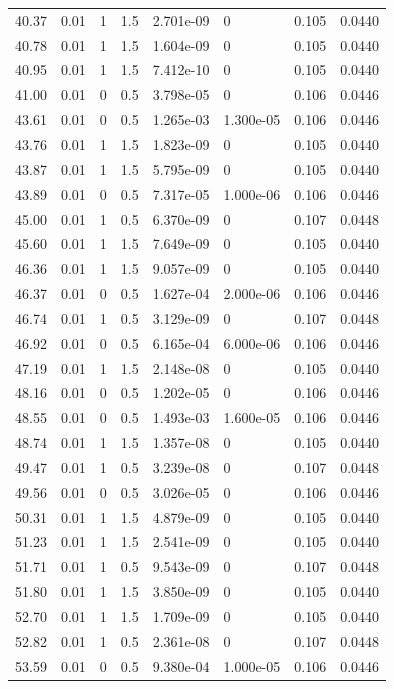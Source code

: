 \documentclass[preview]{standalone}
\begin{document}
{{{\begin{tabular}{L{1.2cm}C{1.2cm} C{0.3cm}C{0.5cm} C{1.4cm}C{1.4cm} C{1.4cm}C{1.4cm}}
  40.37  &  0.01  & 1     & 1.5 &  2.701e-09  & 0  & 0.105 &  0.0440   \\ 
  40.78  &  0.01  & 1     & 1.5 &  1.604e-09  & 0  & 0.105 &  0.0440   \\ 
  40.95  &  0.01  & 1     & 1.5 &  7.412e-10  & 0  & 0.105 &  0.0440   \\ 
  41.00  &  0.01  & 0     & 0.5 &  3.798e-05  & 0  & 0.106 &  0.0446   \\ 
  43.61  &  0.01  & 0     & 0.5 &  1.265e-03  & 1.300e-05  & 0.106 &  0.0446   \\ 
  43.76  &  0.01  & 1     & 1.5 &  1.823e-09  & 0  & 0.105 &  0.0440   \\ 
  43.87  &  0.01  & 1     & 1.5 &  5.795e-09  & 0  & 0.105 &  0.0440   \\ 
  43.89  &  0.01  & 0     & 0.5 &  7.317e-05  & 1.000e-06  & 0.106 &  0.0446   \\ 
  45.00  &  0.01  & 1     & 0.5 &  6.370e-09  & 0  & 0.107 &  0.0448   \\ 
  45.60  &  0.01  & 1     & 1.5 &  7.649e-09  & 0  & 0.105 &  0.0440   \\ 
  46.36  &  0.01  & 1     & 1.5 &  9.057e-09  & 0  & 0.105 &  0.0440   \\ 
  46.37  &  0.01  & 0     & 0.5 &  1.627e-04  & 2.000e-06  & 0.106 &  0.0446   \\ 
  46.74  &  0.01  & 1     & 0.5 &  3.129e-09  & 0  & 0.107 &  0.0448   \\ 
  46.92  &  0.01  & 0     & 0.5 &  6.165e-04  & 6.000e-06  & 0.106 &  0.0446   \\ 
  47.19  &  0.01  & 1     & 1.5 &  2.148e-08  & 0  & 0.105 &  0.0440   \\ 
  48.16  &  0.01  & 0     & 0.5 &  1.202e-05  & 0  & 0.106 &  0.0446   \\ 
  48.55  &  0.01  & 0     & 0.5 &  1.493e-03  & 1.600e-05  & 0.106 &  0.0446   \\ 
  48.74  &  0.01  & 1     & 1.5 &  1.357e-08  & 0  & 0.105 &  0.0440   \\ 
  49.47  &  0.01  & 1     & 0.5 &  3.239e-08  & 0  & 0.107 &  0.0448   \\ 
  49.56  &  0.01  & 0     & 0.5 &  3.026e-05  & 0  & 0.106 &  0.0446   \\ 
  50.31  &  0.01  & 1     & 1.5 &  4.879e-09  & 0  & 0.105 &  0.0440   \\ 
  51.23  &  0.01  & 1     & 1.5 &  2.541e-09  & 0  & 0.105 &  0.0440   \\ 
  51.71  &  0.01  & 1     & 0.5 &  9.543e-09  & 0  & 0.107 &  0.0448   \\ 
  51.80  &  0.01  & 1     & 1.5 &  3.850e-09  & 0  & 0.105 &  0.0440   \\ 
  52.70  &  0.01  & 1     & 1.5 &  1.709e-09  & 0  & 0.105 &  0.0440   \\ 
  52.82  &  0.01  & 1     & 0.5 &  2.361e-08  & 0  & 0.107 &  0.0448   \\ 
  53.59  &  0.01  & 0     & 0.5 &  9.380e-04  & 1.000e-05  & 0.106 &  0.0446   \\ 
\hline 
\end{tabular} 

}}}
\end{document}
